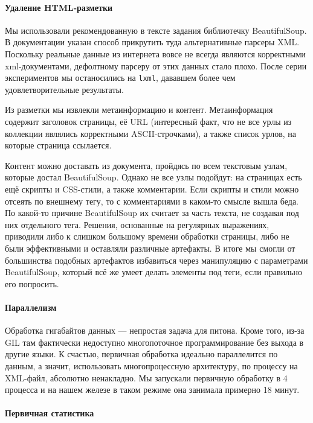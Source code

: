 \paragraph{Удаление HTML-разметки}

Мы использовали рекомендованную в тексте задания библиотечку BeautifulSoup.
В документации указан способ прикрутить туда альтернативные парсеры XML. Поскольку реальные данные из интернета вовсе не всегда являются корректными xml-документами, дефолтному парсеру от этих данных стало плохо.
После серии экспериментов мы останосились на \texttt{lxml}, дававшем более чем удовлетворительные результаты.

Из разметки мы извлекли метаинформацию и контент. Метаинформация содержит заголовок страницы, её URL (интересный факт, что не все урлы из коллекции являлись корректными ASCII-строчками), а также список урлов, на которые страница ссылается.

Контент можно доставать из документа, пройдясь по всем текстовым узлам, которые достал BeautifulSoup.
Однако не все узлы подойдут: на страницах есть ещё скрипты и CSS-стили, а также комментарии.
Если скрипты и стили можно отсеять по внешнему тегу, то с комментариями в каком-то смысле вышла беда.
По какой-то причине BeautifulSoup их считает за часть текста, не создавая под них отдельного тега.
Решения, основанные на регулярных выражениях, приводили либо к слишком большому времени обработки страницы, либо не были эффективными и оставляли различные артефакты.
В итоге мы смогли от большинства подобных артефактов избавиться через манипуляцию с параметрами BeautifulSoup, который всё же умеет делать элементы под теги, если правильно его попросить.

\paragraph{Параллелизм}

Обработка гигабайтов данных — непростая задача для питона.
Кроме того, из-за GIL там фактически недоступно многопоточное программирование без выхода в другие языки.
К счастью, первичная обработка идеально параллелится по данным, а значит, использовать многопроцессную архитектуру, по процессу на XML-файл, абсолютно ненакладно.
Мы запускали первичную обработку в 4 процесса и на нашем железе в таком режиме она занимала примерно 18 минут.

\paragraph{Первичная статистика}

